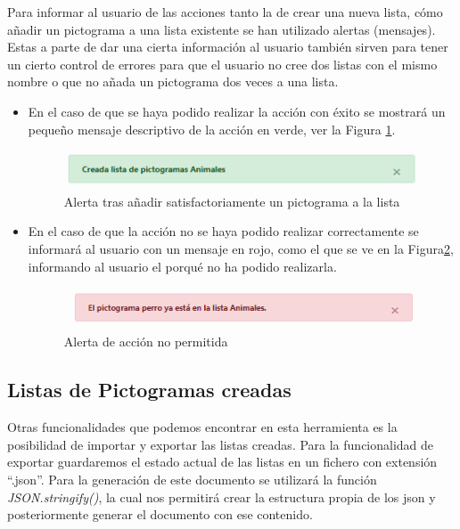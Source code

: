 Para informar al usuario de las acciones tanto la de crear una nueva lista, cómo añadir un pictograma a una lista existente se han utilizado alertas (mensajes). Estas a parte de dar una cierta información al usuario también sirven para tener un cierto control de errores para que el usuario no cree dos listas con el mismo nombre o que no añada un pictograma dos veces a una lista.


\begin{itemize}
	\item En el caso de que se haya podido realizar la acción con éxito se mostrará un pequeño mensaje descriptivo de la acción en verde, ver la Figura \ref{fig:alertlistapicto}.
	
	\begin{figure}[h!]
		\centering
		\includegraphics[width=0.7\linewidth]{Imagenes/Bitmap/alertListaPicto}
		\caption{ Alerta tras añadir satisfactoriamente un pictograma a la lista}
		\label{fig:alertlistapicto}
	\end{figure}
	
	
	\item  En el caso de que la acción no se haya podido realizar correctamente se informará al usuario con un mensaje en rojo, como el que se ve en la Figura\ref{fig:alerterrorlistapicto}, informando al usuario el porqué no ha podido realizarla.
	
	\begin{figure}[h!]
		\centering
		\includegraphics[width=0.7\linewidth]{Imagenes/Bitmap/alertErrorListaPicto}
		\caption{Alerta de acción no permitida}
		\label{fig:alerterrorlistapicto}
	\end{figure}
	
	
	
\end{itemize}

\subsection{Listas de Pictogramas creadas}

Otras funcionalidades que podemos encontrar en esta herramienta es la posibilidad de importar y exportar las listas creadas.
Para la funcionalidad de exportar guardaremos el estado actual de las listas en un fichero con extensión “.json”. Para la generación de este documento se utilizará la función \textit{JSON.stringify()}, la cual nos permitirá crear la estructura propia de los json y posteriormente generar el documento con ese contenido.

